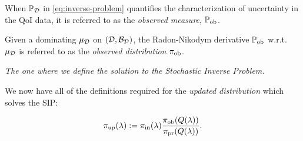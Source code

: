 \begin{frame}

\begin{defn}\label{defn:observed}
When $\mathbb{P}_{\mathcal{D}}$ in \eqref{eq:inverse-problem} quantifies the characterization of uncertainty in the QoI data, it is referred to as the \emph{observed measure}, $\operatorname*{\mathbb{P}_{ob}}$.

\bigskip
Given a dominating $\mu_{\mathcal{D}}$ on $(\mathcal{D}, \mathcal{B}_{\mathcal{D}})$, the Radon-Nikodym derivative $\operatorname*{\mathbb{P}_{ob}}$ w.r.t. $\mu_{\mathcal{D}}$ is referred to as the  \emph{observed distribution} $\operatorname*{\pi_{ob}}$.

\end{defn}

\end{frame}


\begin{frame}{\it The one where we define the solution to the Stochastic Inverse Problem.}

We now have all of the definitions required for the \emph{updated distribution} which solves the SIP:

\bigskip
\begin{equation}\label{eq:updated-pdf}
	\operatorname*{\pi_{up}}(\lambda) := \operatorname*{\pi_{in}}(\lambda)\frac{\operatorname*{\pi_{ob}}(Q(\lambda))}{\operatorname*{\pi_{pr}}(Q(\lambda))}.
\end{equation}

\end{frame}

